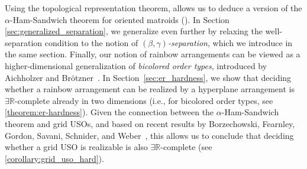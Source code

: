 \documentclass[11pt]{article}
\newcommand{\ER}{\exists\mathbb{R}}
\begin{document}
%
Using the topological representation theorem,  allows us to deduce a version of the $\alpha$-Ham-Sandwich theorem for oriented matroids ().
%
In Section \ref{sec:generalized_separation}, we generalize  even further by relaxing the well-separation condition to the notion of \emph{$(\beta,\gamma)$-separation}, which we introduce in the same section.
%
Finally, our notion of rainbow arrangements can be viewed as a higher-dimensional generalization of \emph{bicolored order types}, introduced by Aichholzer and Br\"{o}tzner~\cite{aichholzerBicoloredOrderTypes2024}. In Section~\ref{sec:er_hardness}, we show that deciding whether a rainbow arrangement can be realized by a hyperplane arrangement is $\ER$-complete already in two dimensions (i.e., for bicolored order types, see \cref{theorem:er-hardness}). Given the connection between the $\alpha$-Ham-Sandwich theorem and grid USOs, and based on recent results by Borzechowski, Fearnley, Gordon, Savani, Schnider, and Weber~\cite{borzechowskiTwoChoicesAre2024}, this allows us to conclude that deciding whether a grid USO is realizable is also $\ER$-complete (see \cref{corollary:grid_uso_hard}).
%
%
\end{document}
